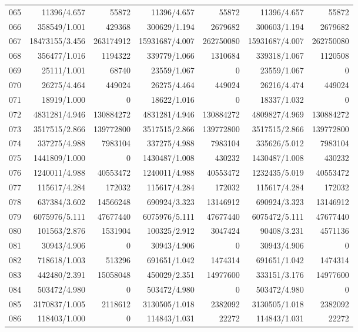 \begin{longtable}{crrrrrr}
065 & 11396/4.657 & 55872 & 11396/4.657 & 55872 & 11396/4.657 & 55872 \\
066 & 358549/1.001 & 429368 & 300629/1.194 & 2679682 & 300603/1.194 & 2679682 \\
067 & 18473155/3.456 & 263174912 & 15931687/4.007 & 262750080 & 15931687/4.007 & 262750080 \\
068 & 356477/1.016 & 1194322 & 339779/1.066 & 1310684 & 339318/1.067 & 1120508 \\
069 & 25111/1.001 & 68740 & 23559/1.067 & 0 & 23559/1.067 & 0 \\
070 & 26275/4.464 & 449024 & 26275/4.464 & 449024 & 26216/4.474 & 449024 \\
071 & 18919/1.000 & 0 & 18622/1.016 & 0 & 18337/1.032 & 0 \\
072 & 4831281/4.946 & 130884272 & 4831281/4.946 & 130884272 & 4809827/4.969 & 130884272 \\
073 & 3517515/2.866 & 139772800 & 3517515/2.866 & 139772800 & 3517515/2.866 & 139772800 \\
074 & 337275/4.988 & 7983104 & 337275/4.988 & 7983104 & 335626/5.012 & 7983104 \\
075 & 1441809/1.000 & 0 & 1430487/1.008 & 430232 & 1430487/1.008 & 430232 \\
076 & 1240011/4.988 & 40553472 & 1240011/4.988 & 40553472 & 1232435/5.019 & 40553472 \\
077 & 115617/4.284 & 172032 & 115617/4.284 & 172032 & 115617/4.284 & 172032 \\
078 & 637384/3.602 & 14566248 & 690924/3.323 & 13146912 & 690924/3.323 & 13146912 \\
079 & 6075976/5.111 & 47677440 & 6075976/5.111 & 47677440 & 6075472/5.111 & 47677440 \\
080 & 101563/2.876 & 1531904 & 100325/2.912 & 3047424 & 90408/3.231 & 4571136 \\
081 & 30943/4.906 & 0 & 30943/4.906 & 0 & 30943/4.906 & 0 \\
082 & 718618/1.003 & 513296 & 691651/1.042 & 1474314 & 691651/1.042 & 1474314 \\
083 & 442480/2.391 & 15058048 & 450029/2.351 & 14977600 & 333151/3.176 & 14977600 \\
084 & 503472/4.980 & 0 & 503472/4.980 & 0 & 503472/4.980 & 0 \\
085 & 3170837/1.005 & 2118612 & 3130505/1.018 & 2382092 & 3130505/1.018 & 2382092 \\
086 & 118403/1.000 & 0 & 114843/1.031 & 22272 & 114843/1.031 & 22272 \\

\end{longtable}
